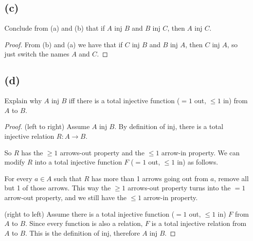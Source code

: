 \documentclass[14pt]{extarticle}
\begin{document}
\subsection{(c)}
Conclude from (a) and (b) that if $A$ inj $B$ and $B$ inj $C$, then $A$ inj $C$.
\begin{proof}
From (b) and (a) we have that if $C$ inj $B$ and $B$ inj $A$, then $C$ inj $A$, so just switch the names $A$ and $C$.
\end{proof}

\subsection{(d)}
Explain why $A$ inj $B$ iff there is a total injective function ($=1$ out, $\leq 1$ in) from $A$ to $B$.
\begin{proof}
(left to right) Assume $A$ inj $B$. By definition of inj, there is a total injective relation $R: A \to B$.

So $R$ has the $\geq 1$ arrows-out property and the $\leq 1$ arrow-in property. We can modify $R$ into a total injective function $F$ ($=1$ out, $\leq 1$ in) as follows. 

For every $a \in A$ such that $R$ has more than 1 arrows going out from $a$, remove all but 1 of those arrows. This way the $\geq 1$ arrows-out property turns into the $=1$ arrow-out property, and we still have the $\leq 1$ arrow-in property.

(right to left) Assume there is a total injective function ($=1$ out, $\leq 1$ in) $F$ from $A$ to $B$. Since every function is also a relation, $F$ is a total injective relation from $A$ to $B$. This is the definition of inj, therefore $A$ inj $B$.
\end{proof}
\end{document}
